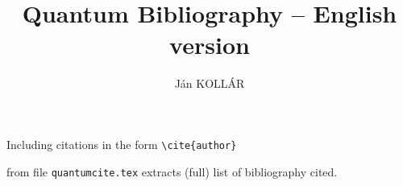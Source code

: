 \documentclass[11pt,a4paper]{article}
\title{Quantum Bibliography -- English version}
\author{J\'an KOLL\'AR}
\begin{document}
Including citations in the form \verb/\cite{author}/



from file \verb/quantumcite.tex/ extracts (full) list of bibliography cited.
 

%
%


         
% 




\end{document}
